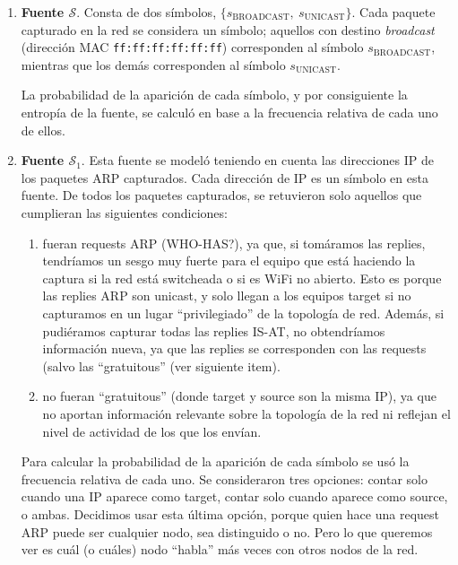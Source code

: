 \begin{enumerate}
    \item \textbf{Fuente $\mathcal{S}$}. Consta de dos símbolos, $\lbrace
    s_{\text{BROADCAST}},\ s_{\text{UNICAST}} \rbrace$. Cada paquete 
    capturado en la red se considera un símbolo; aquellos con destino
    \emph{broadcast} (dirección MAC \texttt{ff:ff:ff:ff:ff:ff}) corresponden
    al símbolo $s_{\text{BROADCAST}}$, mientras que los demás corresponden
    al símbolo $s_{\text{UNICAST}}$.

    La probabilidad de la aparición de cada símbolo, y por consiguiente
    la entropía de la fuente, se calculó en base a la frecuencia relativa
    de cada uno de ellos.
    
    \item \textbf{Fuente $\mathcal{S}_1$}. Esta fuente se modeló teniendo en
    cuenta las direcciones IP de los paquetes ARP capturados. Cada dirección de IP es un símbolo en esta fuente.
    De todos los paquetes capturados, se retuvieron solo aquellos que cumplieran las siguientes condiciones:
    \begin{enumerate}
     \item fueran requests ARP (WHO-HAS?), ya que, si tomáramos las replies, tendríamos
     un sesgo muy fuerte para el equipo que está haciendo la captura si la red está switcheada
     o si es WiFi no abierto. Esto es porque las replies ARP son unicast, y solo llegan a los
     equipos target si no capturamos en un lugar ``privilegiado'' de la topología de red. Además,
     si pudiéramos capturar todas las replies IS-AT, no obtendríamos información nueva, ya que las
     replies se corresponden con las requests (salvo las ``gratuitous'' (ver siguiente item).
     \item no fueran ``gratuitous'' (donde target y source son la misma IP), ya que no 
     aportan información relevante sobre la topología de la red ni reflejan el nivel de actividad de los que los envían.
    \end{enumerate}

    Para calcular la probabilidad de la aparición de cada símbolo se usó la frecuencia relativa de cada uno.
    Se consideraron tres opciones: contar solo cuando una IP aparece como target, contar solo cuando aparece como source, o ambas. Decidimos 
    usar esta última opción, porque quien hace una request ARP puede ser cualquier nodo, sea distinguido o no. Pero lo que queremos
    ver es cuál (o cuáles) nodo ``habla'' más veces con otros nodos de la red.
    
\end{enumerate}

